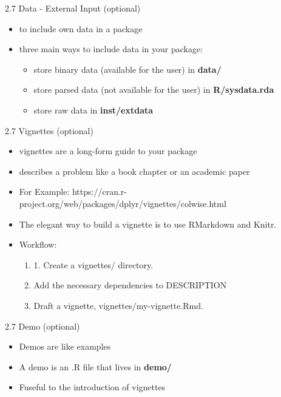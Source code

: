\documentclass[11pt,a4paper]{beamer}
\begin{document}
\begin{frame}[t]{2.7 Data - External Input (optional)}
	
	\begin{itemize}
		\item to	include	own data	in	a	package
		\item three	main	ways	to	include	data	in	your	package:
		\begin{itemize}
			\item store	binary	data (available for the user) in \textbf{data/}
			\item store	parsed	data (not available for the user) in
			\textbf{R/sysdata.rda}
			\item store	raw	data in	\textbf{inst/extdata}
		\end{itemize}

	\end{itemize}
	
\end{frame}






\begin{frame}[t]{2.7 Vignettes (optional)}
	
	\begin{itemize}
		\item  vignettes are a long-form guide to your package
		\item  describes a problem like a book	chapter	or	an	academic paper
		\item For Example: https://cran.r-project.org/web/packages/dplyr/vignettes/colwise.html
		\item The elegant way to build a vignette is to use RMarkdown and Knitr.  
		\item Workflow: 
				
		\begin{enumerate}
			\item 1.	Create	a	vignettes/	directory.
			\item Add	the	necessary	dependencies	to	DESCRIPTION
			\item Draft	a	vignette,	vignettes/my-vignette.Rmd.
		\end{enumerate}
		
	\end{itemize}
	
\end{frame}




\begin{frame}[t]{2.7 Demo (optional)}
	
	\begin{itemize}
		\item Demos	are	like	examples
		\item A	demo is	an .R file that	lives in \textbf{demo/}
		\item Fuseful to the introduction of vignettes
	
		
	\end{itemize}
	
\end{frame}
\end{document}
